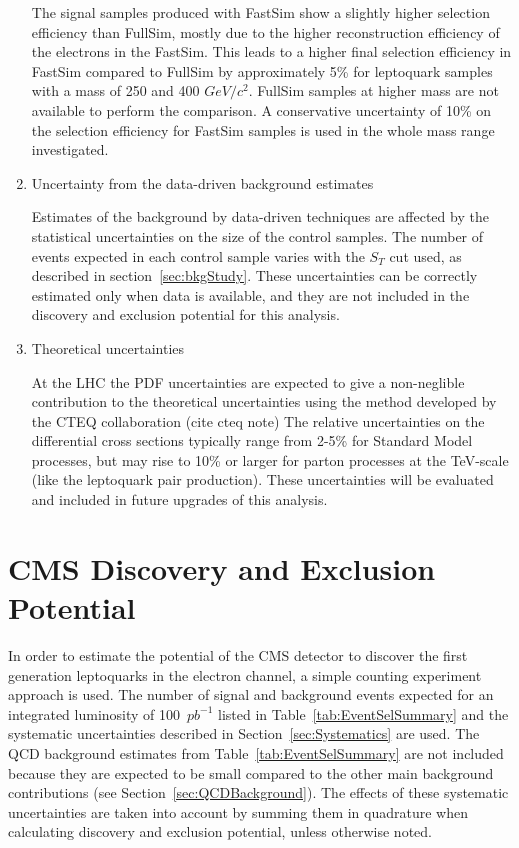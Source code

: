 \documentclass{cmspaper}
\begin{document}
\begin{linenumbers}
\begin{enumerate}
The signal samples produced with FastSim show a slightly higher selection efficiency than FullSim, 
mostly due to the higher reconstruction efficiency of the electrons in the FastSim. 
This leads to a higher final selection efficiency in FastSim compared to FullSim by approximately 5\% 
for leptoquark samples with a mass of 250 and 400 $GeV/c^2$. FullSim samples at higher mass are not available 
to perform the comparison. A conservative uncertainty of 10\% on the selection efficiency 
for FastSim samples is used in the whole mass range investigated. 
%
\item Uncertainty from the data-driven background estimates

Estimates of the background by data-driven techniques are affected by the statistical
uncertainties on the size of the control samples.
The number of events expected in each control sample varies with the $S_T$ cut used, as 
described in section~\ref{sec:bkgStudy}. These uncertainties can be correctly estimated 
only when data is available, and they are not included in the discovery and exclusion potential
for this analysis.
%
\item Theoretical uncertainties 

At the LHC the PDF uncertainties are expected to give a non-neglible
contribution to the theoretical uncertainties using the
method developed by the CTEQ collaboration (cite cteq note)
The relative uncertainties on the differential cross sections 
typically range from 2-5\% for Standard Model processes, 
but may rise to 10\% or larger for parton processes at the TeV-scale 
(like the leptoquark pair production).
These uncertainties will be evaluated and included in future upgrades of this analysis.
\end{enumerate}



\section{CMS Discovery and Exclusion Potential} \label{CMSpotential}

In order to estimate the potential of the CMS detector to discover the first generation leptoquarks
in the electron channel, a simple counting experiment approach is used. 
The number of signal and background events expected for an integrated luminosity of
100~$pb^{-1}$ listed in Table~\ref{tab:EventSelSummary} and the systematic uncertainties described 
in Section~\ref{sec:Systematics} are used. 
The QCD background estimates from Table~\ref{tab:EventSelSummary} 
are not included because they are expected to be 
small compared to the other main background contributions (see Section~\ref{sec:QCDBackground}).
The effects of these systematic uncertainties are taken into account
by summing them in quadrature when calculating discovery and exclusion potential, unless otherwise noted.



\end{linenumbers}
\end{document}

